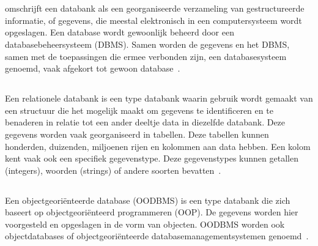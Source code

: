 \section{}
\label{sec:Databank}

\textcite{Oracle23} omschrijft een databank als een georganiseerde verzameling van gestructureerde informatie, of gegevens, die meestal elektronisch in een computersysteem wordt opgeslagen. Een database wordt gewoonlijk beheerd door een databasebeheersysteem (DBMS). Samen worden de gegevens en het DBMS, samen met de toepassingen die ermee verbonden zijn, een databasesysteem genoemd, vaak afgekort tot gewoon database~\autocite{Oracle23}.

\subsection{}
\label{subsec:Relationele Databank}

Een relationele databank is een type databank waarin gebruik wordt gemaakt van een structuur die het mogelijk maakt om gegevens te identificeren en te benaderen in relatie tot een ander deeltje data in diezelfde databank. Deze gegevens worden vaak georganiseerd in tabellen. Deze tabellen kunnen honderden, duizenden, miljoenen rijen en kolommen aan data hebben. Een kolom kent vaak ook een specifiek gegevenstype. Deze gegevenstypes kunnen getallen (integers), woorden (strings) of andere soorten bevatten~\autocite{Codecademy}.

\subsection{}
\label{subsec:Object-georiënteerde databank}

Een objectgeoriënteerde database (OODBMS) is een type databank die zich baseert op objectgeoriënteerd programmeren (OOP). De gegevens worden hier voorgesteld en opgeslagen in de vorm van objecten. OODBMS worden ook objectdatabases of objectgeoriënteerde databasemanagementsystemen genoemd~\autocite{CCorner2019}. 

\subsection{}
\label{subsec:SQL}

